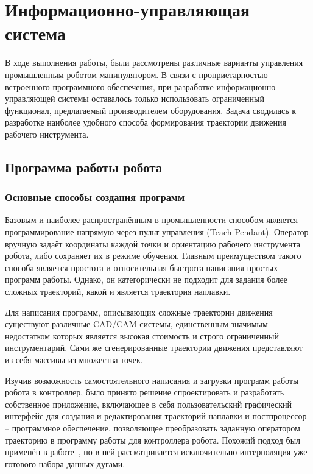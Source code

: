 \chapter{Информационно-управляющая система}
В ходе выполнения работы, были рассмотрены различные варианты управления промышленным роботом-манипулятором.
В связи с проприетарностью встроенного программного обеспечения, при разработке информационно-управляющей системы оставалось только использовать ограниченный функционал, предлагаемый производителем оборудования.
Задача сводилась к разработке наиболее удобного способа формирования траектории движения рабочего инструмента.


\section{Программа работы робота}

\subsection{Основные способы создания программ}
Базовым и наиболее распространённым в промышленности способом является программирование напрямую через пульт управления (Teach Pendant).
Оператор вручную задаёт координаты каждой точки и ориентацию рабочего инструмента робота, либо сохраняет их в режиме обучения.
Главным преимуществом такого способа является простота и относительная быстрота написания простых программ работы.
Однако, он категорически не подходит для задания более сложных траекторий, какой и является траектория наплавки.

Для написания программ, описывающих сложные траектории движения существуют различные CAD/CAM системы, единственным значимым недостатком которых является высокая стоимость и строго ограниченный инструментарий.
Сами же сгенерированные траектории движения представляют из себя массивы из множества точек.

Изучив возможность самостоятельного написания и загрузки программ работы робота в контроллер, было принято решение спроектировать и разработать собственное приложение, включающее в себя пользовательский графический интерфейс для создания и редактирования траекторий наплавки и постпроцессор -- программное обеспечение, позволяющее преобразовать заданную оператором траекторию в программу работы для контроллера робота.
Похожий подход был применён в работе~\cite{Nagata_2017}, но в ней рассматривается исключительно интерполяция уже готового набора данных дугами.

